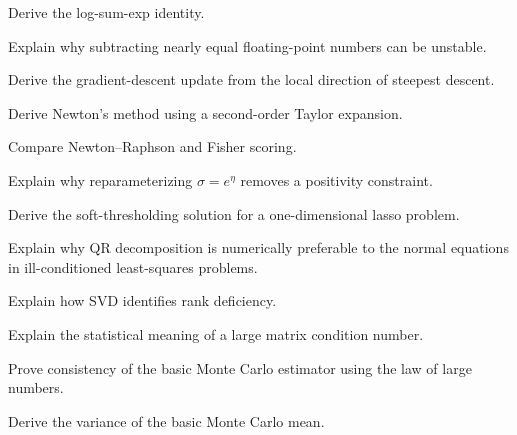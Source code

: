 \begin{exercise}[3]
Derive the log-sum-exp identity.
\end{exercise}

\begin{exercise}[3]
Explain why subtracting nearly equal floating-point numbers can be
unstable.
\end{exercise}

\begin{exercise}[3]
Derive the gradient-descent update from the local direction of steepest
descent.
\end{exercise}

\begin{exercise}[3]
Derive Newton's method using a second-order Taylor expansion.
\end{exercise}

\begin{exercise}[3]
Compare Newton--Raphson and Fisher scoring.
\end{exercise}

\begin{exercise}[3]
Explain why reparameterizing \(\sigma=e^\eta\) removes a positivity
constraint.
\end{exercise}

\begin{exercise}[3]
Derive the soft-thresholding solution for a one-dimensional lasso
problem.
\end{exercise}

\begin{exercise}[3]
Explain why QR decomposition is numerically preferable to the normal
equations in ill-conditioned least-squares problems.
\end{exercise}

\begin{exercise}[3]
Explain how SVD identifies rank deficiency.
\end{exercise}

\begin{exercise}[3]
Explain the statistical meaning of a large matrix condition number.
\end{exercise}

\begin{exercise}[3]
Prove consistency of the basic Monte Carlo estimator using the law of
large numbers.
\end{exercise}

\begin{exercise}[3]
Derive the variance of the basic Monte Carlo mean.
\end{exercise}

